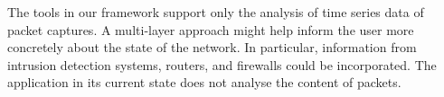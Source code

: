 The tools in our framework support only the analysis of time series data of packet captures. A multi-layer approach might help inform the user more concretely about the state of the network. In particular, information from intrusion detection systems, routers, and firewalls could be incorporated. The application in its current state does not analyse the content of packets.